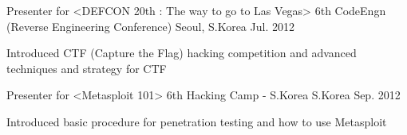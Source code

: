 


\begin{cventries}


\cventry
{Presenter for <DEFCON 20th : The way to go to Las Vegas>} %
{6th CodeEngn (Reverse Engineering Conference)} %
{Seoul, S.Korea} %
{Jul. 2012} %
{ %
\begin{cvitems}
\item {Introduced CTF (Capture the Flag) hacking competition and advanced techniques and strategy for CTF}
\end{cvitems}
}


\cventry
{Presenter for <Metasploit 101>} %
{6th Hacking Camp - S.Korea} %
{S.Korea} %
{Sep. 2012} %
{ %
\begin{cvitems}
\item {Introduced basic procedure for penetration testing and how to use Metasploit}
\end{cvitems}
}


\end{cventries}